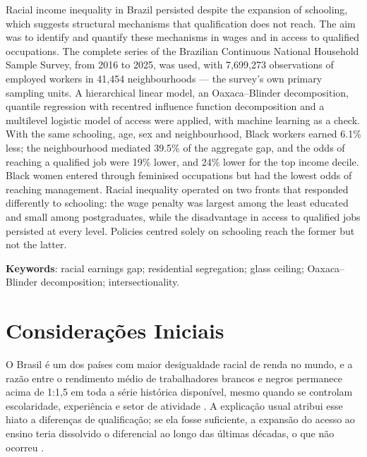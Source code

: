 \documentclass[11pt, a4paper, oneside]{article}
\begin{document}
\begin{singlespace}\noindent
Racial income inequality in Brazil persisted despite the expansion of schooling,
which suggests structural mechanisms that qualification does not reach. The aim was
to identify and quantify these mechanisms in wages and in access to qualified
occupations. The complete series of the Brazilian Continuous National Household Sample
Survey, from 2016 to 2025, was used, with 7,699,273 observations of
employed workers in 41,454 neighbourhoods --- the survey's own primary
sampling units. A hierarchical linear model, an Oaxaca--Blinder decomposition, quantile
regression with recentred influence function decomposition and a multilevel logistic
model of access were applied, with machine learning as a check. With the same schooling,
age, sex and neighbourhood, Black workers earned 6.1\% less; the
neighbourhood mediated 39.5\% of the aggregate gap, and the odds of
reaching a qualified job were 19\% lower, and 24\% lower for the
top income decile. Black women entered through feminised occupations but had the lowest odds of reaching management. Racial inequality operated on two fronts that responded differently to schooling: the wage penalty was largest among the least educated and small among postgraduates, while the disadvantage in access to qualified jobs persisted at every level. Policies centred solely on schooling reach the former but not the latter.
\end{singlespace}

\vspace{\baselineskip}
\noindent\textbf{Keywords}: racial earnings gap; residential segregation; glass
ceiling; Oaxaca--Blinder decomposition; intersectionality.

\newpage


\section*{Considerações Iniciais}

O Brasil é um dos países com maior desigualdade racial de renda no mundo, e a
razão entre o rendimento médio de trabalhadores brancos e negros permanece acima
de 1{:}1,5 em toda a série histórica disponível, mesmo quando se controlam
escolaridade, experiência e setor de atividade \cite{ibge_pnad_2023}. A
explicação usual atribui esse hiato a diferenças de qualificação; se ela fosse
suficiente, a expansão do acesso ao ensino teria dissolvido o diferencial ao
longo das últimas décadas, o que não ocorreu \cite{hasenbalg1979}.
\end{document}
